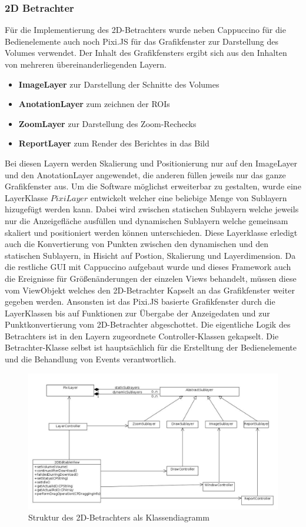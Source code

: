 \subsubsection{2D Betrachter}
\label{sec:2D Betrachter}
Für die Implementierung des 2D-Betrachters wurde neben Cappuccino für die Bedienelemente auch noch Pixi.JS für das Grafikfenster zur Darstellung des Volumes verwendet.
Der Inhalt des Grafikfensters ergibt sich aus den Inhalten von mehreren übereinanderliegenden Layern.
\begin{itemize}
	\item \textbf{ImageLayer} zur Darstellung der Schnitte des Volumes
	\item \textbf{AnotationLayer} zum zeichnen der ROIs
	\item \textbf{ZoomLayer} zur Darstellung des Zoom-Rechecks
	\item \textbf{ReportLayer} zum Render des Berichtes in das Bild
\end{itemize}
Bei diesen Layern werden Skalierung und Positionierung nur auf den ImageLayer und den AnotationLayer angewendet, die anderen füllen jeweils nur das ganze Grafikfenster aus.
Um die Software möglichst erweiterbar zu gestalten,
wurde eine LayerKlasse $PixiLayer$ entwickelt welcher eine beliebige Menge von Sublayern hizugefügt werden kann.
Dabei wird zwischen statischen Sublayern welche jeweils nur die Anzeigefläche ausfüllen und dynamischen Sublayern welche gemeinsam skaliert und positioniert werden können unterschieden.
Diese Layerklasse erledigt auch die Konvertierung von Punkten zwischen den dynamischen und den statischen Sublayern, in Hisicht auf Postion, Skalierung und Layerdimension.
Da die restliche GUI mit Cappuccino aufgebaut wurde und dieses Framework auch die Ereignisse für Größenänderungen der einzelen Views behandelt,
müssen diese vom ViewObjekt welches den 2D-Betrachter Kapselt an das Grafikfenster weiter gegeben werden.
Ansonsten ist das Pixi.JS basierte Grafikfenster durch die LayerKlassen bis auf Funktionen zur Übergabe der Anzeigedaten und zur Punktkonvertierung vom 2D-Betrachter abgeschottet.
Die eigentliche Logik des Betrachters ist in den Layern zugeordnete Controller-Klassen gekapselt.
Die Betrachter-Klasse selbst ist hauptsächlich für die Erstelltung der Bedienelemente und die Behandlung von Events verantwortlich.
\begin{figure}[t]
	\centering
		\includegraphics[width=\linewidth]{img/s3_2dview_class_structure.jpg}
	\caption{Struktur des 2D-Betrachters als Klassendiagramm}
	\label{fig:omip_aplication_layout}
\end{figure}

